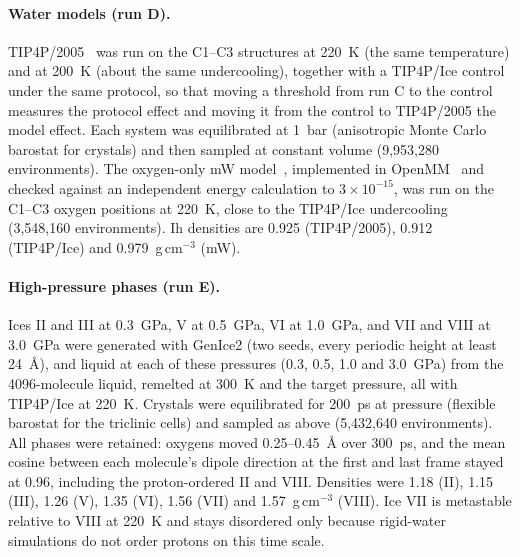 \documentclass[11pt,a4paper]{article}
\begin{document}
\paragraph{Water models (run D).} TIP4P/2005~\cite{Abascal2005b} was run on
the C1--C3 structures at 220~K (the same temperature) and at 200~K (about the
same undercooling), together with a TIP4P/Ice control under the same
protocol, so that moving a threshold from run C to the control measures the
protocol effect and moving it from the control to TIP4P/2005 the model effect.
Each system was equilibrated at 1~bar (anisotropic Monte Carlo barostat for
crystals) and then sampled at constant volume (9,953,280 environments). The
oxygen-only mW model~\cite{Molinero2009}, implemented in OpenMM~\cite{Eastman2024}
and checked against an independent energy calculation to $3\times10^{-15}$,
was run on the C1--C3 oxygen positions at 220~K, close to the TIP4P/Ice
undercooling (3,548,160 environments). Ih densities are 0.925 (TIP4P/2005),
0.912 (TIP4P/Ice) and 0.979~g\,cm$^{-3}$ (mW).

\paragraph{High-pressure phases (run E).} Ices II and III at 0.3~GPa, V at
0.5~GPa, VI at 1.0~GPa, and VII and VIII at 3.0~GPa were generated with GenIce2
(two seeds, every periodic height at least 24~\AA), and liquid at each of
these pressures (0.3, 0.5, 1.0 and 3.0~GPa) from the 4096-molecule liquid,
remelted at 300~K and the target pressure, all with TIP4P/Ice at 220~K. Crystals
were equilibrated for 200~ps at pressure (flexible barostat for the
triclinic cells) and sampled as above (5,432,640 environments). All phases
were retained: oxygens moved 0.25--0.45~\AA{} over 300~ps, and the mean cosine
between each molecule's dipole direction at the first and last frame stayed
at 0.96, including the proton-ordered II and VIII. Densities were 1.18 (II),
1.15 (III), 1.26 (V), 1.35 (VI), 1.56 (VII) and 1.57~g\,cm$^{-3}$ (VIII). Ice
VII is metastable relative to VIII at 220~K and stays disordered only because
rigid-water simulations do not order protons on this time scale.
\end{document}
